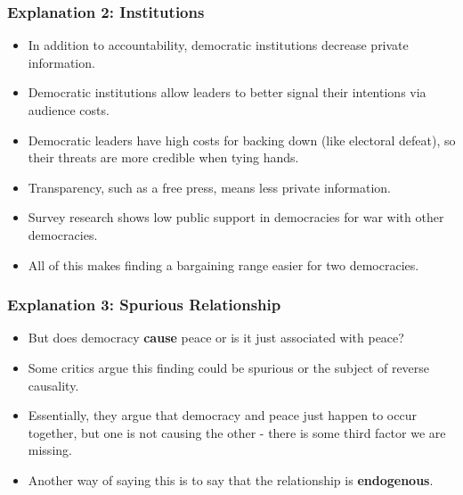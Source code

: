 \documentclass[handout]{beamer}
\begin{document}
\begin{frame} 
\frametitle{\LARGE{Explanation 2: Institutions}}
\begin{itemize}
	\item In addition to accountability, democratic institutions decrease private information.
	\item Democratic institutions allow leaders to better signal their intentions via audience costs. \pause 
	\item Democratic leaders have high costs for backing down (like electoral defeat), so their threats are more credible when tying hands. \pause 
	\item Transparency, such as a free press, means less private information. \pause
	\item Survey research shows low public support in democracies for war with other democracies.
	\item All of this makes finding a bargaining range easier for two democracies.
\end{itemize}
\end{frame}

\begin{frame} 
\frametitle{\LARGE{Explanation 3: Spurious Relationship}}
\begin{itemize}
		\item But does democracy \textbf{cause} peace or is it just associated with peace? \pause
		\item Some critics argue this finding could be spurious or the subject of reverse causality. \pause 
		\item Essentially, they argue that democracy and peace just happen to occur together, but one is not causing the other - there is some third factor we are missing.
		\item Another way of saying this is to say that the relationship is \textbf{endogenous}.
\end{itemize}
\end{frame}
\end{document}

